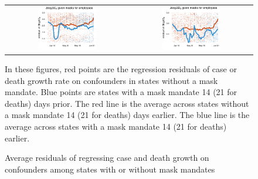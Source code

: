 \documentclass[11pt]{article}
\begin{document}
\begin{enumerate}
\begin{figure}[ht]
  \caption{Average  residuals of regressing case and death growth on confounders among states with or without  mask mandates \label{fig:masks-res}}\vspace{0.2cm}
 \begin{minipage}{\linewidth}
    \centering
    \begin{tabular}{cc}
      \includegraphics[width=0.5\textwidth]{tables_and_figures/pmaskbus-cases-res-14}
      &
        \includegraphics[width=0.5\textwidth]{tables_and_figures/pmaskbus-deaths-res-21}
    \end{tabular}
    \begin{flushleft}
      \scriptsize In these figures, red points are the regression residuals of case or death
      growth rate on confounders in states without a mask mandate. Blue points are
      states with a mask mandate 14 (21 for deaths) days prior. The
      red line is the average across states without a mask mandate 14
      (21 for deaths) days earlier. The blue line is the average
      across states with a mask mandate 14 (21 for deaths) earlier.
    \end{flushleft}
  \end{minipage}
\end{figure}



\end{enumerate}
\end{document}
